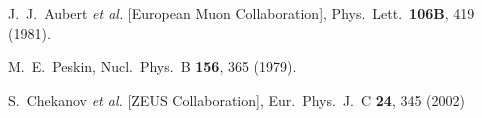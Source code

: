 \documentclass[10pt,prd,aps,nofootinbib,superscriptaddress]{revtex4}
\begin{document}
\begin{thebibliography}{99}
  J.~J.~Aubert {\it et al.} [European Muon Collaboration],
  Phys.\ Lett.\  {\bf 106B}, 419 (1981).
 
  M.~E.~Peskin,
  Nucl.\ Phys.\ B {\bf 156}, 365 (1979).

 

  S.~Chekanov {\it et al.} [ZEUS Collaboration],
  Eur.\ Phys.\ J.\ C {\bf 24}, 345 (2002)

\end{thebibliography}
\end{document}
